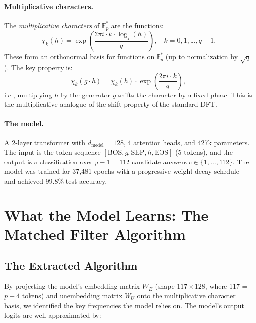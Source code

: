 \documentclass[11pt]{article}
\newcommand{\Fps}{\mathbb{F}_p^*}
\newcommand{\logg}{\log_g}
\begin{document}
\paragraph{Multiplicative characters.}
The \emph{multiplicative characters} of $\Fps$ are the functions:
\begin{equation}
    \chi_k(h) = \exp\!\left(\frac{2\pi i \cdot k \cdot \logg(h)}{q}\right), \quad k = 0, 1, \ldots, q-1.
    \label{eq:mult_char}
\end{equation}
These form an orthonormal basis for functions on $\Fps$ (up to normalization by $\sqrt{q}$). The key property is:
\begin{equation}
    \chi_k(g \cdot h) = \chi_k(h) \cdot \exp\!\left(\frac{2\pi i \cdot k}{q}\right),
\end{equation}
i.e., multiplying $h$ by the generator $g$ shifts the character by a fixed phase. This is the multiplicative analogue of the shift property of the standard DFT.

\paragraph{The model.}
A 2-layer transformer with $d_{\text{model}} = 128$, 4 attention heads, and 427k parameters. The input is the token sequence $[\text{BOS}, g, \text{SEP}, h, \text{EOS}]$ (5 tokens), and the output is a classification over $p - 1 = 112$ candidate answers $c \in \{1, \ldots, 112\}$. The model was trained for 37,481 epochs with a progressive weight decay schedule and achieved 99.8\% test accuracy.


\section{What the Model Learns: The Matched Filter Algorithm}

\subsection{The Extracted Algorithm}

By projecting the model's embedding matrix $W_E$ (shape $117 \times 128$, where 117 = $p + 4$ tokens) and unembedding matrix $W_U$ onto the multiplicative character basis, we identified the key frequencies the model relies on. The model's output logits are well-approximated by:
\end{document}
